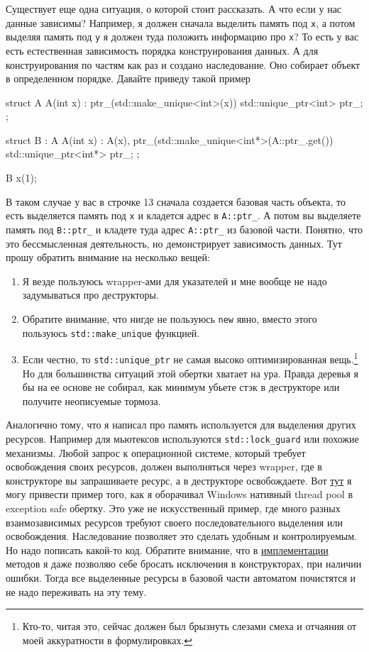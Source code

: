 \documentclass{article}
\begin{document}
Существует еще одна ситуация, о которой стоит рассказать. А что если у нас данные зависимы? Например, я должен сначала выделить память под \verb"x", а потом выделяя память под \verb"y" я должен туда положить информацию про \verb"x"? То есть у вас есть естественная зависимость порядка конструирования данных. А для конструирования по частям как раз и создано наследование. Оно собирает объект в определенном порядке. Давайте приведу такой пример
\begin{cppcode}
struct A {
  A(int x) : ptr_(std::make_unique<int>(x)) {}
  std::unique_ptr<int> ptr_;
};

struct B : A {
  A(int x)
   : A(x),
     ptr_(std::make_unique<int*>(A::ptr_.get()) {}
   std::unique_ptr<int*> ptr_;
};

B x(1);
\end{cppcode}
В таком случае у вас в строчке 13 сначала создается базовая часть объекта, то есть выделяется память под \verb"x" и кладется адрес в \verb"A::ptr_". А потом вы выделяете память под \verb"B::ptr_" и кладете туда адрес \verb"A::ptr_" из базовой части. Понятно, что это бессмысленная деятельность, но демонстрирует зависимость данных. Тут прошу обратить внимание на несколько вещей:
\begin{enumerate}
\item Я везде пользуюсь wrapper-ами для указателей и мне вообще не надо задумываться про деструкторы.
\item Обратите внимание, что нигде не пользуюсь \verb"new" явно, вместо этого пользуюсь \verb"std::make_unique" функцией.
\item Если честно, то \verb"std::unique_ptr" не самая высоко оптимизированная вещь.\footnote{Кто-то, читая это, сейчас должен был брызнуть слезами смеха и отчаяния от моей аккуратности в формулировках.} Но для большинства ситуаций этой обертки хватает на ура. Правда деревья я бы на ее основе не собирал, как минимум убьете стэк в деструкторе или получите неописуемые тормоза.
\end{enumerate}

Аналогично тому, что я написал про память используется для выделения других ресурсов. Например для мьютексов используются \verb"std::lock_guard" или похожие механизмы. Любой запрос к операционной системе, который требует освобождения своих ресурсов, должен выполняться через wrapper, где в конструкторе вы запрашиваете ресурс, а в деструкторе освобождаете. Вот \href{https://github.com/DimaTrushin/TypingAnalysisQt/blob/master/ThreadPool.h}{тут} я могу привести пример того, как я оборачивал Windows нативный thread pool в exception safe обертку. Это уже не искусственный пример, где много разных взаимозависимых ресурсов требуют своего последовательного выделения или освобождения. Наследование позволяет это сделать удобным и контролируемым. Но надо пописать какой-то код. Обратите внимание, что в \href{https://github.com/DimaTrushin/TypingAnalysisQt/blob/master/ThreadPool.cpp}{имплементации} методов я даже позволяю себе бросать исключения в конструкторах, при наличии ошибки. Тогда все выделенные ресурсы в базовой части автоматом почистятся и не надо переживать на эту тему.
\end{document}
